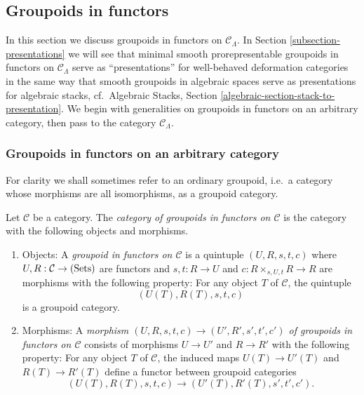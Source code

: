 \subsection{Groupoids in functors}
\label{subsection-groupoids-in-functors}
In this section we discuss groupoids in functors on $\mathcal C_{\Lambda}$.  In 
Section \ref{subsection-presentations} we will see that minimal smooth 
prorepresentable groupoids in functors on $\mathcal C_{\Lambda}$ serve as 
``presentations'' for well-behaved deformation categories in the same way that 
smooth groupoids in algebraic spaces serve as presentations for algebraic 
stacks,
cf.\ Algebraic Stacks, Section \ref{algebraic-section-stack-to-presentation}.
We begin with generalities 
on groupoids in functors on an arbitrary category, then pass to the category 
$\mathcal C_{\Lambda}$.

\subsubsection{Groupoids in functors on an arbitrary category}
For clarity we shall sometimes refer to an ordinary groupoid, i.e.\ a category 
whose morphisms are all isomorphisms, as a groupoid category.

\begin{definition}
\label{definition-groupoid-in-functors}
Let $\mathcal C$ be a category. The \emph{category of groupoids in functors on 
$\mathcal C$} is the category with the following objects and morphisms.
\begin{enumerate}
\item Objects: A \emph{groupoid in functors on $\mathcal C$} is a quintuple 
$(U,R,s,t,c)$ where $U,R: \mathcal C \rightarrow \textnormal{(Sets)}$ are 
functors and $s,t: R \rightarrow U$ and $c: R \times_{s,U,t} R \rightarrow R$ 
are morphisms with the following property: For any object $T$ of $\mathcal C$, 
the quintuple
\[ (U(T), R(T), s,t,c) \]
is a groupoid category.
\item Morphisms: A \emph{morphism $(U,R,s,t,c) \rightarrow (U',R',s',t',c')$ of 
groupoids in functors on $\mathcal C$} consists of morphisms $U \rightarrow U'$ 
and $R \rightarrow R'$ with the following property: For any object $T$ of 
$\mathcal C$, the induced maps $U(T) \rightarrow U'(T)$ and $R(T) \rightarrow 
R'(T)$ define a functor between groupoid categories
\[ (U(T), R(T), s,t,c) \rightarrow (U'(T), R'(T), s',t',c') .\] 
\end{enumerate}
\end{definition}

